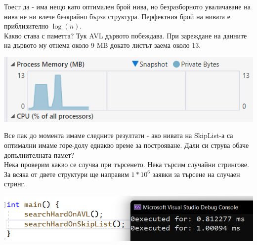 \documentclass[a4paper,12pt,fleqn]{article}
\begin{document}
	Тоест да - има нещо като оптимален брой нива, но безразборното уваличаване на нива не ни влече безкрайно бърза структура. Перфектния брой на нивата е приблизително $\log(n)$.\\
	Какво става с паметта? Тук AVL дървото побеждава. При зареждане на данните на дървото му отнема около 9 MB докато листът заема около 13.\\
	\begin{center}
	\includegraphics[scale=0.4]{mem-consume.png}\\
	\end{center}
	Все пак до момента имаме следните резултати - ако нивата на SkipList-а са оптимални имаме горе-долу еднакво време за построяване. Дали си струва обаче допълнителната памет?\\
	Нека проверим какво се случва при търсенето. Нека търсим случайни стрингове. За всяка от двете структури ще направим $1*10^6$ заявки за търсене на случаен стринг.\\
	\begin{center}
		\includegraphics[scale=0.4]{search.png}\\
	\end{center}
	
\end{document}
